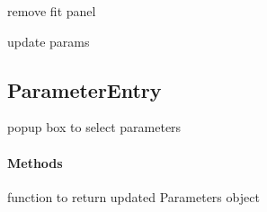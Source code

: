 \documentclass[letterpaper,10pt,english]{sphinxmanual}
\begin{document}
\begin{fulllineitems}

\begin{fulllineitems}
\label{Options:Optionswidgets.Options.remove_fit_panel}
remove fit panel

\end{fulllineitems}


\begin{fulllineitems}
\label{Options:Optionswidgets.Options.save_params}
update params

\end{fulllineitems}


\begin{fulllineitems}
\label{Options:Optionswidgets.Options.set_current_fit}
\end{fulllineitems}


\end{fulllineitems}



\subsection{ParameterEntry}
\label{ParameterEntry::doc}\label{ParameterEntry:parameterentry}

\begin{fulllineitems}
\label{ParameterEntry:Optionswidgets.ParameterEntry}
popup box to select parameters
\paragraph{Methods}

\begin{fulllineitems}
\label{ParameterEntry:Optionswidgets.ParameterEntry.readout}
function to return updated Parameters object

\end{fulllineitems}


\end{fulllineitems}
\end{document}
